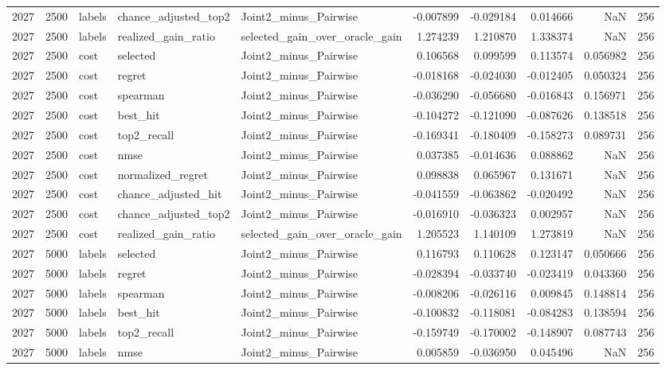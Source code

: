\begin{tabular}{rrlllrrrrr}
2027 & 2500 & labels & chance_adjusted_top2 & Joint2_minus_Pairwise & -0.007899 & -0.029184 & 0.014666 & NaN & 256 \\
2027 & 2500 & labels & realized_gain_ratio & selected_gain_over_oracle_gain & 1.274239 & 1.210870 & 1.338374 & NaN & 256 \\
2027 & 2500 & cost & selected & Joint2_minus_Pairwise & 0.106568 & 0.099599 & 0.113574 & 0.056982 & 256 \\
2027 & 2500 & cost & regret & Joint2_minus_Pairwise & -0.018168 & -0.024030 & -0.012405 & 0.050324 & 256 \\
2027 & 2500 & cost & spearman & Joint2_minus_Pairwise & -0.036290 & -0.056680 & -0.016843 & 0.156971 & 256 \\
2027 & 2500 & cost & best_hit & Joint2_minus_Pairwise & -0.104272 & -0.121090 & -0.087626 & 0.138518 & 256 \\
2027 & 2500 & cost & top2_recall & Joint2_minus_Pairwise & -0.169341 & -0.180409 & -0.158273 & 0.089731 & 256 \\
2027 & 2500 & cost & nmse & Joint2_minus_Pairwise & 0.037385 & -0.014636 & 0.088862 & NaN & 256 \\
2027 & 2500 & cost & normalized_regret & Joint2_minus_Pairwise & 0.098838 & 0.065967 & 0.131671 & NaN & 256 \\
2027 & 2500 & cost & chance_adjusted_hit & Joint2_minus_Pairwise & -0.041559 & -0.063862 & -0.020492 & NaN & 256 \\
2027 & 2500 & cost & chance_adjusted_top2 & Joint2_minus_Pairwise & -0.016910 & -0.036323 & 0.002957 & NaN & 256 \\
2027 & 2500 & cost & realized_gain_ratio & selected_gain_over_oracle_gain & 1.205523 & 1.140109 & 1.273819 & NaN & 256 \\
2027 & 5000 & labels & selected & Joint2_minus_Pairwise & 0.116793 & 0.110628 & 0.123147 & 0.050666 & 256 \\
2027 & 5000 & labels & regret & Joint2_minus_Pairwise & -0.028394 & -0.033740 & -0.023419 & 0.043360 & 256 \\
2027 & 5000 & labels & spearman & Joint2_minus_Pairwise & -0.008206 & -0.026116 & 0.009845 & 0.148814 & 256 \\
2027 & 5000 & labels & best_hit & Joint2_minus_Pairwise & -0.100832 & -0.118081 & -0.084283 & 0.138594 & 256 \\
2027 & 5000 & labels & top2_recall & Joint2_minus_Pairwise & -0.159749 & -0.170002 & -0.148907 & 0.087743 & 256 \\
2027 & 5000 & labels & nmse & Joint2_minus_Pairwise & 0.005859 & -0.036950 & 0.045496 & NaN & 256 \\

\end{tabular}
